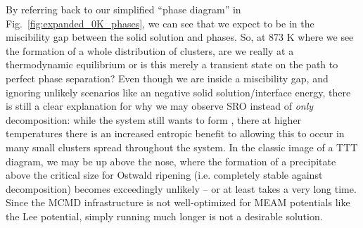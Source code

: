 By referring back to our simplified ``phase diagram'' in Fig.~\ref{fig:expanded_0K_phases}, we can see that we expect to be in the miscibility gap between the solid solution and \DOTHREE phases.
So, at 873 K where we see the formation of a whole distribution of clusters, are we really at a thermodynamic equilibrium or is this merely a transient state on the path to perfect phase separation?
Even though we are inside a miscibility gap, and ignoring unlikely scenarios like an negative solid solution/\DOTHREE interface energy, there is still a clear explanation for why we may observe SRO instead of \emph{only} decomposition: while the system still wants to form \DOTHREE, there at higher temperatures there is an increased entropic benefit to allowing this \DOTHREE to occur in many small clusters spread throughout the system.
In the classic image of a TTT diagram, we may be up above the nose, where the formation of a precipitate above the critical size for Ostwald ripening (i.e. completely stable against decomposition) becomes exceedingly unlikely -- or at least takes a very long time.
Since the MCMD infrastructure is not well-optimized for MEAM potentials like the Lee potential, simply running much longer is not a desirable solution.

